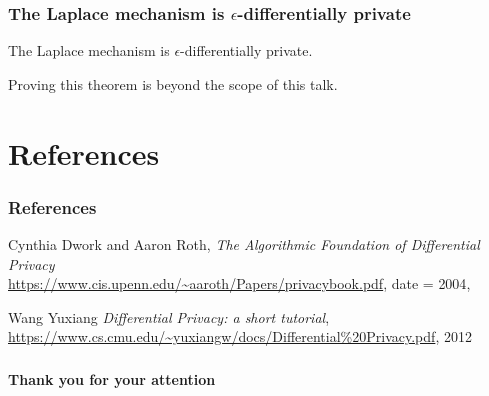 \documentclass[xcolor=dvipsnames]{beamer}
\begin{document}
      \begin{frame} %
      	\frametitle{The Laplace mechanism is $\epsilon$-differentially private}
      	\pause \begin{thm}
      	  The Laplace mechanism is $\epsilon$-differentially private.
      	\end{thm}
      	\pause Proving this theorem is beyond the scope of this talk. 
      \end{frame}
    \section*{References}
      \begin{frame} %
      	\frametitle{References}
      	\begin{thebibliography}{9}
      	  	Cynthia Dwork and Aaron Roth,
      	  	\emph{The Algorithmic Foundation of Differential Privacy}\\
      	  	\url{https://www.cis.upenn.edu/~aaroth/Papers/privacybook.pdf},
      	  	date = {2004},
      	  
      	  	Wang Yuxiang
      	  	\emph{Differential Privacy: a short tutorial},
      	  	\url{https://www.cs.cmu.edu/~yuxiangw/docs/Differential\%20Privacy.pdf},
      	    2012
      	\end{thebibliography}
      \end{frame}

      \begin{frame} %
    	\frametitle{}
    	\centering
    	\Large{\textbf{Thank you for your attention}}
      \end{frame}
\end{document}
